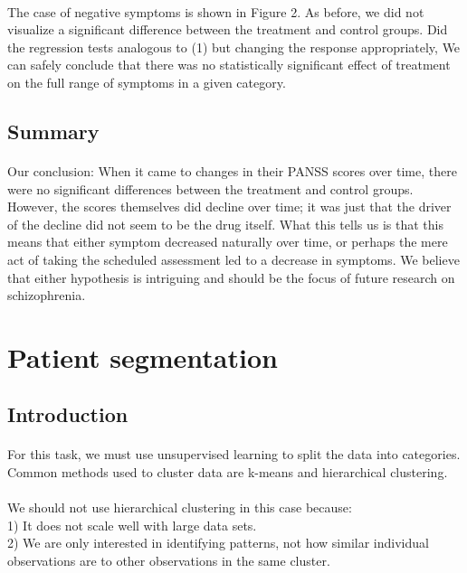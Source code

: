\documentclass{article}
\begin{document}
\paragraph{}The case of negative symptoms is shown in Figure 2. As before, we did not visualize a significant difference between the treatment and control groups.
Did the regression tests analogous to (1) but changing the response appropriately, We can safely conclude that there was no statistically significant effect of treatment on the full range of symptoms in a given category.


	\subsection{Summary} \paragraph{}Our conclusion: When it came to changes in their PANSS scores over time, there were no significant differences between the treatment and control groups. However, the scores themselves did decline over time; it was just that the driver of the decline did not seem to be the drug itself. What this tells us is that this means that either symptom decreased naturally over time, or perhaps the mere act of taking the scheduled assessment led to a decrease in symptoms. We believe that either hypothesis is intriguing and should be the focus of future research on schizophrenia.

\section{Patient segmentation}
	\subsection{Introduction}
	\paragraph{} For this task, we must use unsupervised learning to split the data into categories. 
Common methods used to cluster data are k-means and hierarchical clustering.
\paragraph{}We should not use hierarchical clustering in this case because:\\
1)	It does not scale well with large data sets.\\
2)	We are only interested in identifying patterns, not how similar individual observations are to other observations in the same cluster.\\
\end{document}
